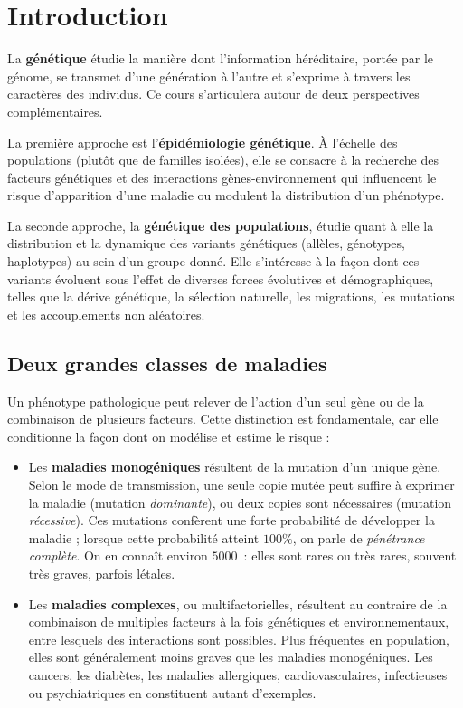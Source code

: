 \chapter{Introduction}

La \textbf{génétique} étudie la manière dont l'information héréditaire, portée par le génome, se transmet d'une génération à l'autre et s'exprime à travers les caractères des individus. Ce cours s'articulera autour de deux perspectives complémentaires.

La première approche est l'\textbf{épidémiologie génétique}. À l'échelle des populations (plutôt que de familles isolées), elle se consacre à la recherche des facteurs génétiques et des interactions gènes-environnement qui influencent le risque d'apparition d'une maladie ou modulent la distribution d'un phénotype.

La seconde approche, la \textbf{génétique des populations}, étudie quant à elle la distribution et la dynamique des variants génétiques (allèles, génotypes, haplotypes) au sein d'un groupe donné. Elle s'intéresse à la façon dont ces variants évoluent sous l'effet de diverses forces évolutives et démographiques, telles que la dérive génétique, la sélection naturelle, les migrations, les mutations et les accouplements non aléatoires.

\section{Deux grandes classes de maladies}

Un phénotype pathologique peut relever de l'action d'un seul gène ou de la combinaison de plusieurs facteurs. Cette distinction est fondamentale, car elle conditionne la façon dont on modélise et estime le risque :

\begin{itemize}
\item Les \textbf{maladies monogéniques} résultent de la mutation d'un unique gène. Selon le mode de transmission, une seule copie mutée peut suffire à exprimer la maladie (mutation \textit{dominante}), ou deux copies sont nécessaires (mutation \textit{récessive}). Ces mutations confèrent une forte probabilité de développer la maladie ; lorsque cette probabilité atteint $100\%$, on parle de \textit{pénétrance
complète}. On en connaît environ $5000$~: elles sont rares ou très rares, souvent
très graves, parfois létales.
\item Les \textbf{maladies complexes}, ou multifactorielles, résultent au contraire de la combinaison de multiples facteurs à la fois génétiques et environnementaux, entre lesquels des interactions sont possibles. Plus fréquentes en population, elles sont généralement moins graves que les maladies monogéniques. Les cancers, les diabètes, les maladies allergiques, cardiovasculaires, infectieuses ou psychiatriques en constituent autant d'exemples.
\end{itemize}

